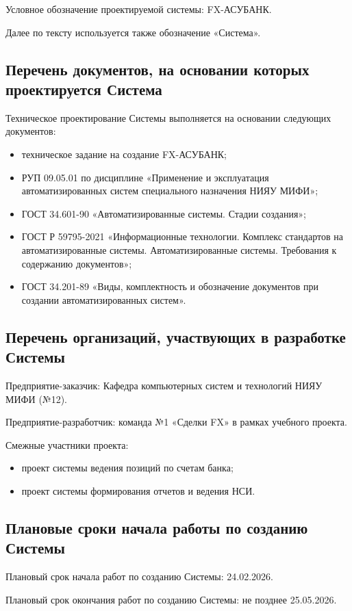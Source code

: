 \documentclass[a4paper,14pt]{extarticle}
\newcommand{\OrgName}{Кафедра компьютерных систем и технологий НИЯУ МИФИ (№12)}
\newcommand{\SystemShortName}{FX-АСУБАНК}
\begin{document}
Условное обозначение проектируемой системы: \SystemShortName.

Далее по тексту используется также обозначение «Система».

\subsection{Перечень документов, на основании которых проектируется Система}
Техническое проектирование Системы выполняется на основании следующих документов:
\begin{itemize}[itemsep=1mm]
  \item техническое задание на создание \SystemShortName;
  \item РУП 09.05.01 по дисциплине «Применение и эксплуатация автоматизированных систем специального назначения НИЯУ МИФИ»;
  \item ГОСТ 34.601-90 «Автоматизированные системы. Стадии создания»;
  \item ГОСТ Р 59795-2021 «Информационные технологии. Комплекс стандартов на автоматизированные системы. Автоматизированные системы. Требования к содержанию документов»;
  \item ГОСТ 34.201-89 «Виды, комплектность и обозначение документов при создании автоматизированных систем».
\end{itemize}

\subsection{Перечень организаций, участвующих в разработке Системы}
Предприятие-заказчик: \OrgName.

Предприятие-разработчик: команда №1 «Сделки FX» в рамках учебного проекта.

Смежные участники проекта:
\begin{itemize}[itemsep=1mm]
  \item проект системы ведения позиций по счетам банка;
  \item проект системы формирования отчетов и ведения НСИ.
\end{itemize}

\subsection{Плановые сроки начала работы по созданию Системы}
Плановый срок начала работ по созданию Системы: 24.02.2026.

Плановый срок окончания работ по созданию Системы: не позднее 25.05.2026.
\end{document}
